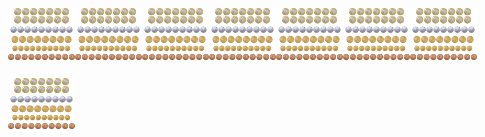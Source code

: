 \includegraphics[width=0.69797in,height=0.67970in]{media/image120.png}\includegraphics[width=0.69797in,height=0.67970in]{media/image120.png}\includegraphics[width=0.69797in,height=0.67970in]{media/image120.png}\includegraphics[width=0.69797in,height=0.67970in]{media/image120.png}\includegraphics[width=0.69797in,height=0.67970in]{media/image120.png}\includegraphics[width=0.69797in,height=0.67970in]{media/image120.png}\includegraphics[width=0.69797in,height=0.67970in]{media/image120.png}\includegraphics[width=0.69797in,height=0.67970in]{media/image120.png}

